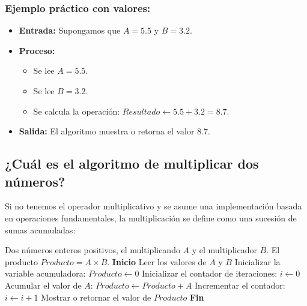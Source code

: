 \documentclass[12pt]{article}
\begin{document}
\subsubsection*{Ejemplo práctico con valores:}
\begin{itemize}
    \item \textbf{Entrada:} Supongamos que $A = 5.5$ y $B = 3.2$.
    \item \textbf{Proceso:} 
    \begin{itemize}
        \item Se lee $A = 5.5$.
        \item Se lee $B = 3.2$.
        \item Se calcula la operación: $Resultado \leftarrow 5.5 + 3.2 = 8.7$.
    \end{itemize}
    \item \textbf{Salida:} El algoritmo muestra o retorna el valor $8.7$.
\end{itemize}

\subsection{¿Cuál es el algoritmo de multiplicar dos números?}
Si no tenemos el operador multiplicativo y se asume una implementación basada en operaciones fundamentales, la multiplicación se define como una sucesión de sumas acumuladas:
\begin{algorithm}[H]
\caption{Multiplicación mediante sumas sucesivas}
\begin{algorithmic}[1]
    \Require Dos números enteros positivos, el multiplicando $A$ y el multiplicador $B$.
    \Ensure El producto $Producto = A \times B$.
    \State \textbf{Inicio}
    \State Leer los valores de $A$ y $B$
    \State Inicializar la variable acumuladora: $Producto \leftarrow 0$
    \State Inicializar el contador de iteraciones: $i \leftarrow 0$
        \State Acumular el valor de $A$: $Producto \leftarrow Producto + A$
        \State Incrementar el contador: $i \leftarrow i + 1$
    \EndWhile
    \State Mostrar o retornar el valor de $Producto$
    \State \textbf{Fin}
\end{algorithmic}
\end{algorithm}
\end{document}
